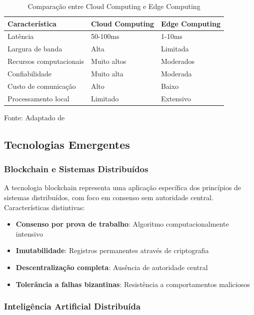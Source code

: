 \begin{table}[H]
\centering
\caption{Comparação entre Cloud Computing e Edge Computing}
\begin{tabular}{|l|l|l|}
\hline
\textbf{Característica} & \textbf{Cloud Computing} & \textbf{Edge Computing} \\
\hline
Latência & 50-100ms & 1-10ms \\
\hline
Largura de banda & Alta & Limitada \\
\hline
Recursos computacionais & Muito altos & Moderados \\
\hline
Confiabilidade & Muito alta & Moderada \\
\hline
Custo de comunicação & Alto & Baixo \\
\hline
Processamento local & Limitado & Extensivo \\
\hline
\end{tabular}

\label{tab:cloud_vs_edge}

{\fontsize{10pt}{\baselineskip}\selectfont
Fonte: Adaptado de }
\end{table}

\subsection{Tecnologias Emergentes}

\subsubsection{Blockchain e Sistemas Distribuídos}

A tecnologia blockchain representa uma aplicação específica dos princípios de sistemas distribuídos, com foco em consenso sem autoridade central. Características distintivas:

\begin{itemize}
    \item \textbf{Consenso por prova de trabalho}: Algoritmo computacionalmente intensivo
    \item \textbf{Imutabilidade}: Registros permanentes através de criptografia
    \item \textbf{Descentralização completa}: Ausência de autoridade central
    \item \textbf{Tolerância a falhas bizantinas}: Resistência a comportamentos maliciosos
\end{itemize}

\subsubsection{Inteligência Artificial Distribuída}

